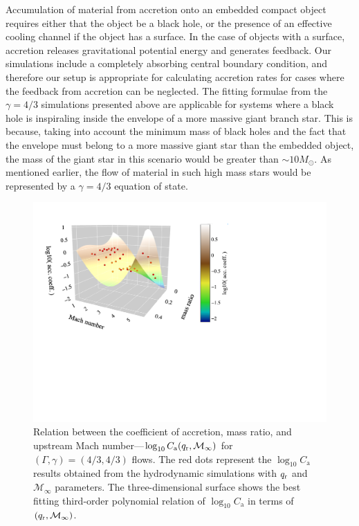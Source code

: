Accumulation of material from accretion onto an embedded compact object requires either that the object be a black hole, or the presence of an effective cooling channel if the object has a surface. In the case of objects with a surface, accretion releases gravitational potential energy and generates feedback. Our simulations include a completely absorbing central boundary condition, and therefore our setup is appropriate for calculating accretion rates for cases where the feedback from accretion can be neglected. The fitting formulae from the $\gamma = 4/3$ simulations presented above are applicable for systems where a black hole is inspiraling inside the envelope of a more massive giant branch star. This is because, taking into account the minimum mass of black holes and the fact that the envelope must belong to a more massive giant star than the embedded object, the mass of the giant star in this scenario would be greater than $\sim 10 M_\odot$. As mentioned earlier, the flow of material in such high mass stars would be represented by a $\gamma = 4/3$ equation of state.  

\begin{figure}
  \centering
  \includegraphics[width=14cm]{figures/common_envelope/logmdot_order3_g43.pdf}
\caption{Relation between the coefficient of accretion, mass ratio, and upstream Mach number---$\log_{10}C_{\mathrm a} (q_{\rm r}, \mathcal{M}_\infty)$ for $(\Gamma, \gamma) = (4/3, 4/3)$ flows. The red dots represent the $\log_{10}C_{\mathrm a}$ results obtained from the hydrodynamic simulations with $q_{\rm r}$ and $\mathcal{M}_\infty$ parameters. The three-dimensional surface shows the best fitting third-order polynomial relation of $\log_{10}C_{\mathrm a}$ in terms of $(q_{\rm r}, \mathcal{M}_\infty)$.\label{fig:logmdot_g43}}
\end{figure}

